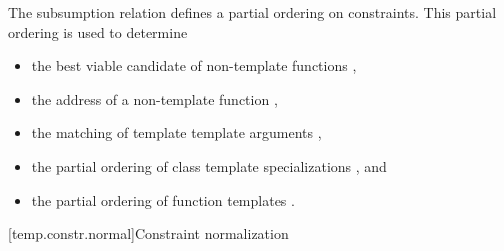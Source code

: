 \documentclass{wg21}
\begin{document}
\pnum
\begin{note}
The subsumption relation defines a partial ordering on constraints.
This partial ordering is used to determine
\begin{itemize}
    \item the best viable candidate of non-template functions ,
    \item the address of a non-template function ,
    \item the matching of template template arguments ,
    \item the partial ordering of class template specializations , and
    \item the partial ordering of function templates .
\end{itemize}
\end{note}


[temp.constr.normal]{Constraint normalization}
%
\end{document}
